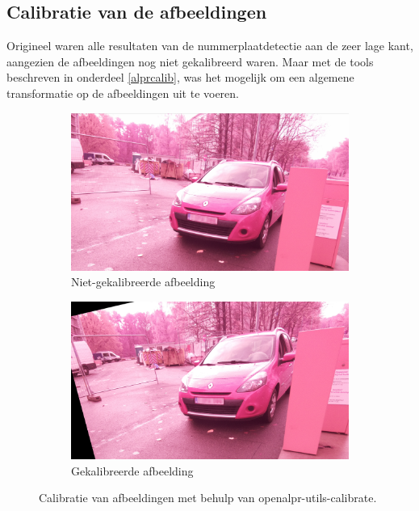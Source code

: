 \subsection{Calibratie van de afbeeldingen}
Origineel waren alle resultaten van de nummerplaatdetectie aan de zeer lage kant, aangezien de afbeeldingen nog niet gekalibreerd waren. Maar met de tools beschreven in onderdeel \ref{alprcalib}, was het mogelijk om een algemene transformatie op de afbeeldingen uit te voeren.
\begin{figure}[h!]
	\centering
	\begin{subfigure}[b]{0.4\linewidth}
		\includegraphics[width=\linewidth]{img/calibration/pre-calibrate.png}
		\caption{Niet-gekalibreerde afbeelding}
	\end{subfigure}
	\begin{subfigure}[b]{0.4\linewidth}
		\includegraphics[width=\linewidth]{img/calibration/calibrate-cut.png}
		\caption{Gekalibreerde afbeelding}
	\end{subfigure}
	\label{fig:calibration}
	\caption{Calibratie van afbeeldingen met behulp van openalpr-utils-calibrate.}
\end{figure}

